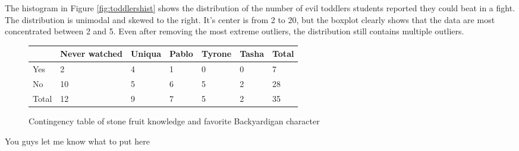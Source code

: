 \documentclass{article}
\begin{document}
\begin{figure}[ht]
\end{figure}

The histogram in Figure \ref{fig:toddlershist} shows the distribution of the
number of evil toddlers students reported they could beat in a fight. The
distribution is unimodal and skewed to the right. It's center is from 2 to 20,
but the boxplot clearly shows that the data are most concentrated between 2 and
5. Even after removing the most extreme outliers, the distribution still
contains multiple outliers.

\begin{figure}[ht]
    \centering
    \caption{Contingency table of stone fruit knowledge and favorite Backyardigan character}
    \label{fig:contingency}
    \begin{tabular}{l|l|l|l|l|l|l}
        \toprule
        & Never watched & Uniqua & Pablo & Tyrone & Tasha & Total\\
        \midrule
        Yes & 2 & 4 & 1 & 0 & 0 & 7 \\
        No & 10 & 5 & 6 & 5 & 2 & 28 \\
        Total & 12 & 9 & 7 & 5 & 2 & 35 \\
    \end{tabular}
\end{figure}

You guys let me know what to put here
\end{document}
